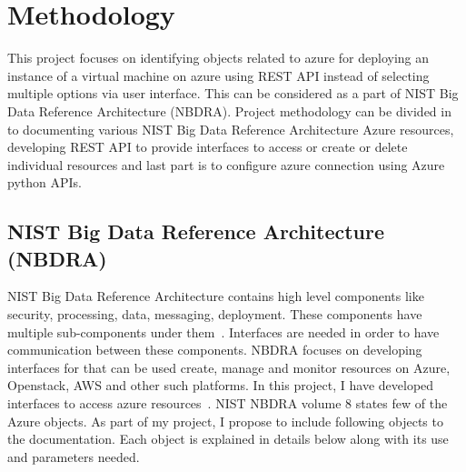 \section{Methodology}
This project focuses on identifying objects related to azure for deploying an
instance of a virtual machine on azure using REST API instead of selecting
multiple options via user interface. This can be considered as a part of NIST
Big Data Reference Architecture (NBDRA). Project methodology can be divided in
to documenting various NIST Big Data Reference Architecture Azure resources,
developing REST API to provide interfaces to access or create or
delete individual resources and last part is to configure azure connection
using Azure python APIs.

\subsection{NIST Big Data Reference Architecture (NBDRA)}
NIST Big Data Reference Architecture contains high level components like
security, processing, data, messaging, deployment. These components have
multiple sub-components under them~\cite{hid-sp18-502-nist-vol8}.
Interfaces are needed in order to have
communication between these components. NBDRA focuses on developing interfaces
for that can be used create, manage and monitor resources on Azure, Openstack,
AWS and other such platforms. In this project, I have developed interfaces to
access azure resources~\cite{hid-sp18-502-nist-vol8}. NIST NBDRA volume 8
states few of the Azure objects. As
part of my project, I propose to include following objects to the
documentation. Each object is explained in details below along with its use and
parameters
needed.

